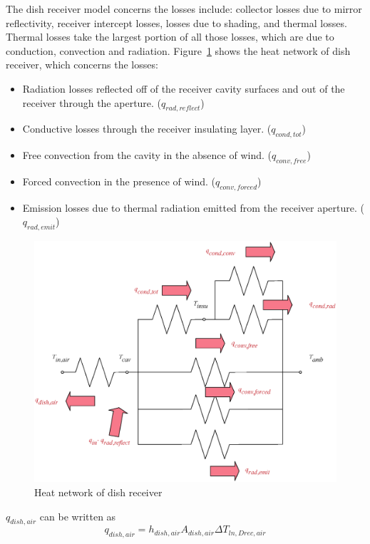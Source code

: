 \documentclass{article}
\begin{document}
The dish receiver model concerns the losses include: collector losses due to mirror reflectivity, receiver intercept losses, losses due to shading, and thermal losses. Thermal losses take the largest portion of all those losses, which are due to conduction, convection and radiation. Figure~\ref{fig:thermal-lose} shows the heat network of dish receiver, which concerns the losses:
\begin{itemize}
	\item Radiation losses reflected off of the receiver cavity surfaces and out of the receiver through the aperture. ($q_{rad,reflect}$)
	\item Conductive losses through the receiver insulating layer. ($q_{cond,tot}$)
	\item Free convection from the cavity in the absence of wind. ($q_{conv,free}$)
	\item Forced convection in the presence of wind. ($q_{conv,forced}$)
	\item Emission losses due to thermal radiation emitted from the receiver aperture. ($q_{rad,emit}$)
\end{itemize}

\noindent \begin{figure}[htbp]
\begin{center}
	\includegraphics[width = 0.7\columnwidth]{./graphics/thermalLosses}
	\caption{Heat network of dish receiver}
	\label{fig:thermal-lose}
\end{center}
\end{figure}

$q_{dish,air}$ can be written as
\begin{equation*}
	q_{dish,air}=h_{dish,air}A_{dish,air}\Delta{}T_{ln,Drec,air}
\end{equation*}
\end{document}
